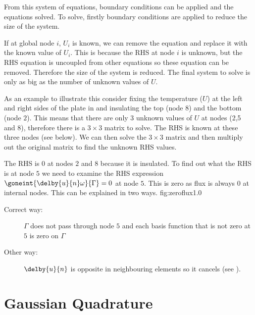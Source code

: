 From this system of equations, boundary conditions can be applied and the
equations solved. To solve, firstly boundary conditions are applied to reduce
the size of the system.

If at global node $i$, $U_{i}$ is known, we can remove the  equation
and replace it with the known value of $U_{i}$. This is because the RHS at
node $i$ is unknown, but the RHS equation is uncoupled from other equations so these
equation can be removed.
Therefore the size of the system is reduced. The final system to solve is only
as big as the number of unknown values of $U$. 

As an example to illustrate this consider fixing the temperature ($U$) at the
left and right sides of the plate in  and insulating the top (node
 $8$) and the bottom (node $2$). 
This means that there are only $3$ unknown values of $U$ at nodes (2,5 and 8), 
therefore there is a $3 \times 3$ matrix to solve. The RHS is known at these
three nodes (see below). We can then solve the $3 \times 3$ matrix and then multiply out
the original matrix to find the unknown RHS values.

The RHS is $0$ at nodes $2$ and $8$ because it is insulated.
To find out what the RHS is at node $5$ we need to examine the RHS expression
 $\goneint{\delby{u}{n}\omega}{\Gamma} = 0$ at node $5$. This is zero as flux is always $0$ at
internal nodes. This can be explained in two ways.
   {fig:zeroflux}{1.0}
\begin{description}
   \item [Correct way:] $\Gamma$ does not pass through node $5$ and each
     basis function that is
     not zero at $5$ is zero on $\Gamma$
   \item [Other way:] $\delby{u}{n}$ is opposite in neighbouring elements so
     it cancels (see ).
\end{description}



\section{Gaussian Quadrature}
\label{sec:Gquad}

